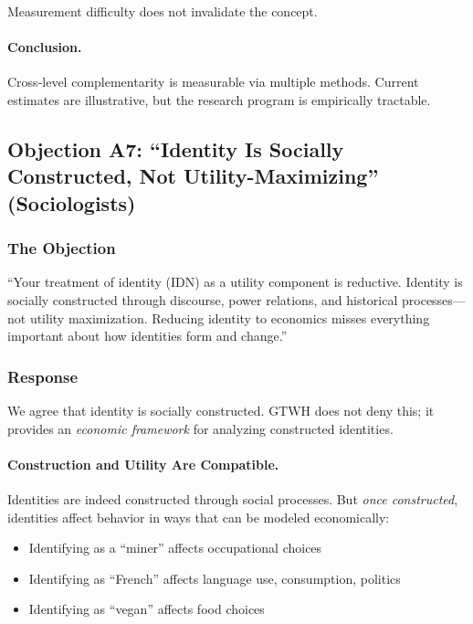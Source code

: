 \documentclass[12pt,a4paper]{article}
\begin{document}
Measurement difficulty does not invalidate the concept.

\paragraph{Conclusion.}

Cross-level complementarity is measurable via multiple methods. Current 
estimates are illustrative, but the research program is empirically tractable.

\subsection{Objection A7: ``Identity Is Socially Constructed, Not Utility-Maximizing'' (Sociologists)}
\label{app:identity-construction}

\subsubsection{The Objection}

\begin{tcolorbox}[colback=red!5!white, colframe=red!75!black, title=Sociologist's Objection]
``Your treatment of identity (IDN) as a utility component is reductive. 
Identity is socially constructed through discourse, power relations, and 
historical processes---not utility maximization. Reducing identity to 
economics misses everything important about how identities form and change.''
\end{tcolorbox}

\subsubsection{Response}

We agree that identity is socially constructed. GTWH does not deny this; 
it provides an \textit{economic framework} for analyzing constructed identities.

\paragraph{Construction and Utility Are Compatible.}

Identities are indeed constructed through social processes. But \textit{once 
constructed}, identities affect behavior in ways that can be modeled 
economically:
\begin{itemize}[nosep]
\item Identifying as a ``miner'' affects occupational choices
\item Identifying as ``French'' affects language use, consumption, politics
\item Identifying as ``vegan'' affects food choices
\end{itemize}
\end{document}
